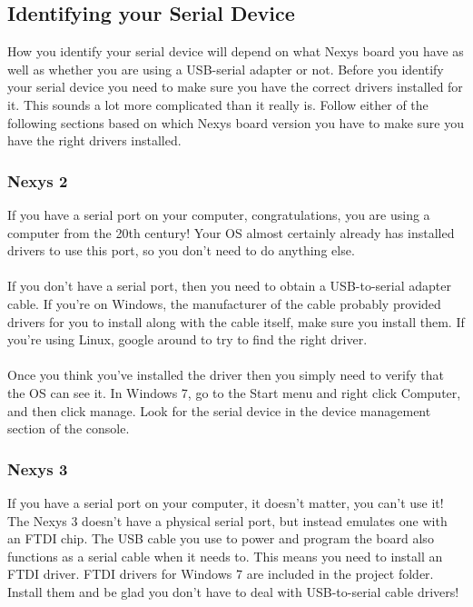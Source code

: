 \documentclass[notitlepage]{article}
\begin{document}
\subsection{Identifying your Serial Device}
\label{sec:serial_id}
How you identify your serial device will depend on what Nexys board you have as well as whether you are using a USB-serial adapter or not. Before you identify your serial device you need to make sure you have the correct drivers installed for it. This sounds a lot more complicated than it really is. Follow either of the following sections based on which Nexys board version you have to make sure you have the right drivers installed.

\subsubsection{Nexys 2}
If you have a serial port on your computer, congratulations, you are using a computer from the 20th century! Your OS almost certainly already has installed drivers to use this port, so you don't need to do anything else.\\\\
If you don't have a serial port, then you need to obtain a USB-to-serial adapter cable. If you're on Windows, the manufacturer of the cable probably provided drivers for you to install along with the cable itself, make sure you install them. If you're using Linux, google around to try to find the right driver.\\\\
Once you think you've installed the driver then you simply need to verify that the OS can see it. In Windows 7, go to the Start menu and right click Computer, and then click manage. Look for the serial device in the device management section of the console. 

\subsubsection{Nexys 3}
If you have a serial port on your computer, it doesn't matter, you can't use it! The Nexys 3 doesn't have a physical serial port, but instead emulates one with an FTDI chip. The USB cable you use to power and program the board also functions as a serial cable when it needs to. This means you need to install an FTDI driver. FTDI drivers for Windows 7 are included in the project folder. Install them and be glad you don't have to deal with USB-to-serial cable drivers!
\end{document}
